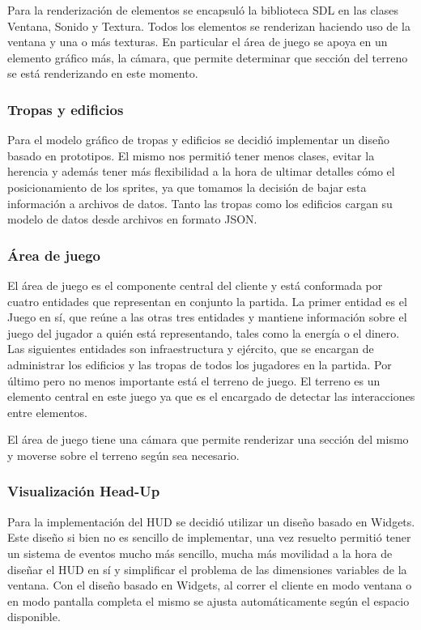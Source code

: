 \documentclass[titlepage,a4paper,12pt]{article}
\begin{document}
Para la renderización de elementos se encapsuló la biblioteca SDL en las clases Ventana, Sonido y Textura. Todos los elementos se renderizan haciendo uso de la ventana y una o más texturas. En particular el área de juego se apoya en un elemento gráfico más, la cámara, que permite determinar que sección del terreno se está renderizando en este momento.

\subsubsection{Tropas y edificios}
Para el modelo gráfico de tropas y edificios se decidió implementar un diseño basado en prototipos. El mismo nos permitió tener menos clases, evitar la herencia y además tener más flexibilidad a la hora de ultimar detalles cómo el posicionamiento de los sprites, ya que tomamos la decisión de bajar esta información a archivos de datos. Tanto las tropas como los edificios cargan su modelo de datos desde archivos en formato JSON.

\subsubsection{Área de juego}
El área de juego es el componente central del cliente y está conformada por cuatro entidades que representan en conjunto la partida. La primer entidad es el Juego en sí, que reúne a las otras tres entidades y mantiene información sobre el juego del jugador a quién está representando, tales como la energía o el dinero.
Las siguientes entidades son infraestructura y ejército, que se encargan de administrar los edificios y las tropas de todos los jugadores en la partida.
Por último pero no menos importante está el terreno de juego. El terreno es un elemento central en este juego ya que es el encargado de detectar las interacciones entre elementos. 

El área de juego tiene una cámara que permite renderizar una sección del mismo y moverse sobre el terreno según sea necesario. 

\subsubsection{Visualización Head-Up}
Para la implementación del HUD se decidió utilizar un diseño basado en Widgets. Este diseño si bien no es sencillo de implementar, una vez resuelto permitió tener un sistema de eventos mucho más sencillo, mucha más movilidad a la hora de diseñar el HUD en sí y simplificar el problema de las dimensiones variables de la ventana. Con el diseño basado en Widgets, al correr el cliente en modo ventana o en modo pantalla completa el mismo se ajusta automáticamente según el espacio disponible.
\end{document}
